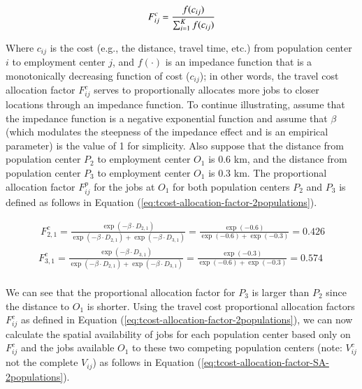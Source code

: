 \documentclass[]{elsarticle} %
\begin{document}
\begin{equation}
\label{eq:tcost-alloc-factor}
F^c_{ij} = \frac{f(c_{ij})}{\sum_{i=1}^K f(c_{ij})}\\
\end{equation}

Where \(c_{ij}\) is the cost (e.g., the distance, travel time, etc.)
from population center \(i\) to employment center \(j\), and
\(f(\cdot)\) is an impedance function that is a monotonically decreasing
function of cost (\(c_{ij}\)); in other words, the travel cost
allocation factor \(F^c_{ij}\) serves to proportionally allocates more
jobs to closer locations through an impedance function. To continue
illustrating, assume that the impedance function is a negative
exponential function and assume that \(\beta\) (which modulates the
steepness of the impedance effect and is an empirical parameter) is the
value of 1 for simplicity. Also suppose that the distance from
population center \(P_2\) to employment center \(O_1\) is 0.6 km, and
the distance from population center \(P_3\) to employment center \(O_1\)
is 0.3 km. The proportional allocation factor \(F^p_{ij}\) for the jobs
at \(O_1\) for both population centers \(P_2\) and \(P_3\) is defined as
follows in Equation (\ref{eq:tcost-allocation-factor-2populations}).

\begin{equation}
\label{eq:tcost-allocation-factor-2populations}
\begin{array}{l}\
F^c_{2,1} = \frac{\exp(-\beta \cdot D_{2,1})}{\exp(-\beta \cdot D_{2,1}) + \exp(-\beta \cdot D_{3,1})} = \frac{\exp(-0.6)}{\exp(-0.6) + \exp(-0.3)} = 0.426\\
F^c_{3,1} = \frac{\exp(-\beta \cdot D_{3,1})}{\exp(-\beta \cdot D_{2,1}) + \exp(-\beta \cdot D_{3,1})}  = \frac{\exp(-0.3)}{\exp(-0.6) + \exp(-0.3)} = 0.574\\
\end{array}
\end{equation}

We can see that the proportional allocation factor for \(P_3\) is larger
than \(P_2\) since the distance to \(O_1\) is shorter. Using the travel
cost proportional allocation factors \(F^c_{ij}\) as defined in Equation
(\ref{eq:tcost-allocation-factor-2populations}), we can now calculate
the spatial availability of jobs for each population center based only
on \(F^c_{ij}\) and the jobs available \(O_1\) to these two competing
population centers (note: \(V^c_{ij}\) not the complete \(V_{ij}\)) as
follows in Equation (\ref{eq:tcost-allocation-factor-SA-2populations}).
\end{document}
